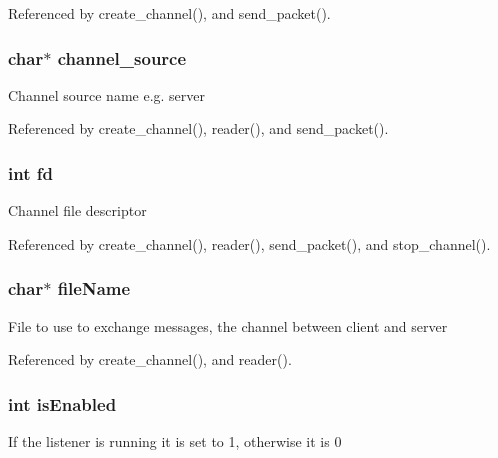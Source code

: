 Referenced by create\+\_\+channel(), and send\+\_\+packet().

\subsubsection[{\texorpdfstring{channel\+\_\+source}{channel_source}}]{\setlength{\rightskip}{0pt plus 5cm}char$\ast$ channel\+\_\+source}\hypertarget{structchannel__t_a0a72aa1c901810c34da12df46f40041e}{}\label{structchannel__t_a0a72aa1c901810c34da12df46f40041e}
Channel source name e.\+g. server 

Referenced by create\+\_\+channel(), reader(), and send\+\_\+packet().

\subsubsection[{\texorpdfstring{fd}{fd}}]{\setlength{\rightskip}{0pt plus 5cm}int fd}\hypertarget{structchannel__t_a6f8059414f0228f0256115e024eeed4b}{}\label{structchannel__t_a6f8059414f0228f0256115e024eeed4b}
Channel file descriptor 

Referenced by create\+\_\+channel(), reader(), send\+\_\+packet(), and stop\+\_\+channel().

\subsubsection[{\texorpdfstring{file\+Name}{fileName}}]{\setlength{\rightskip}{0pt plus 5cm}char$\ast$ file\+Name}\hypertarget{structchannel__t_a25c8761bc1f523fe6a53db546ae83add}{}\label{structchannel__t_a25c8761bc1f523fe6a53db546ae83add}
File to use to exchange messages, the channel between client and server 

Referenced by create\+\_\+channel(), and reader().

\subsubsection[{\texorpdfstring{is\+Enabled}{isEnabled}}]{\setlength{\rightskip}{0pt plus 5cm}int is\+Enabled}\hypertarget{structchannel__t_a5c56d01677044a9e8009acf457aa1a37}{}\label{structchannel__t_a5c56d01677044a9e8009acf457aa1a37}
If the listener is running it is set to 1, otherwise it is 0 

